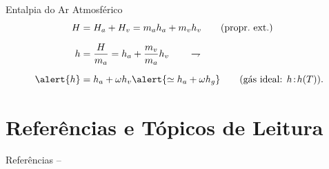     \begin{frame}{Entalpia do Ar Atmosférico}\vspace*{-0em}
        \begin{align*}
            H &= H_a + H_v = m_ah_a + m_vh_v
            \qquad\mbox{(propr.~ext.)}
            \\[\medskipamount]
            h &= \frac{H}{m_a} = h_a + \frac{m_v}{m_a}h_v
            \qquad\rightharpoondown
            \\[\medskipamount]
            \alert{h} &
            = h_a + \omega h_v
            \alert{\simeq h_a + \omega h_g}
            \qquad\mbox{(gás ideal: $h\!:\!h(T)$)}.
        \end{align*}
    \end{frame}

\section{Referências e Tópicos de Leitura}

    \begin{frame}[allowframebreaks]{Referências -- }
        
        
    \end{frame}

